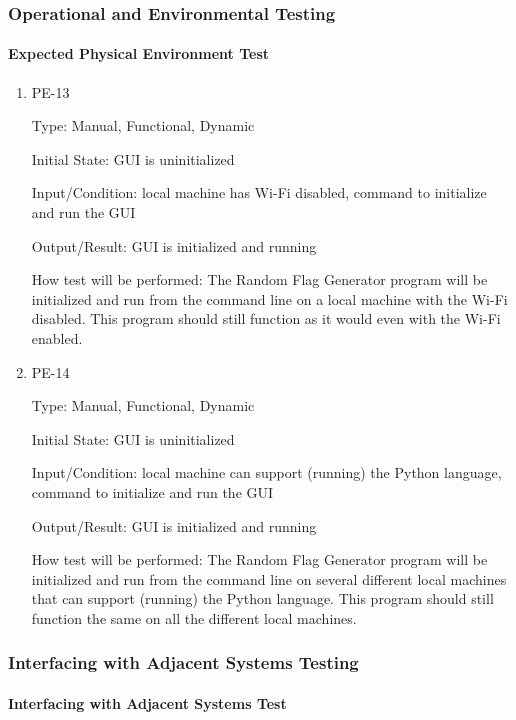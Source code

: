 \documentclass[12pt, titlepage]{article}
\begin{document}
\subsubsection{Operational and Environmental Testing}

\paragraph{Expected Physical Environment Test}

\begin{enumerate}

\item{PE-13\\}

Type: Manual, Functional, Dynamic

Initial State: GUI is uninitialized

Input/Condition: local machine has Wi-Fi disabled, command to initialize and
run the GUI

Output/Result: GUI is initialized and running

How test will be performed: The Random Flag Generator program will be
initialized and run from the command line on a local machine with the Wi-Fi
disabled. This program should still function as it would even with the Wi-Fi
enabled.

\item{PE-14\\}

Type: Manual, Functional, Dynamic

Initial State: GUI is uninitialized

Input/Condition: local machine can support (running) the Python language,
command to initialize and run the GUI

Output/Result: GUI is initialized and running

How test will be performed: The Random Flag Generator program will be
initialized and run from the command line on several different local machines
that can support (running) the Python language. This program should still
function the same on all the different local machines.

\end{enumerate}

\subsubsection{Interfacing with Adjacent Systems Testing}

\paragraph{Interfacing with Adjacent Systems Test}
\end{document}
